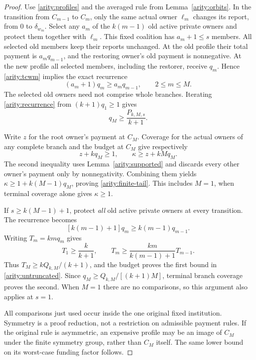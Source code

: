 \begin{proof}
Use \eqref{arity:profiles} and the averaged rule from
Lemma~\ref{arity:orbits}.  In the transition from $C_{m-1}$ to $C_m$, only
the same actual owner $\ell_m$ changes its report, from $0$ to $\delta_{w_m}$.
Select any $a_m$ of the $k(m-1)$ old active private owners and protect them
together with $\ell_m$.  This fixed coalition has $a_m+1\leq s$ members.
All selected old members keep their reports unchanged.  At the old profile
their total payment is $a_mq_{m-1}$, and the restoring owner's old payment
is nonnegative.  At the new profile all selected members, including the
restorer, receive $q_m$.  Hence \eqref{arity:tcwm} implies the exact recurrence
\begin{equation}
  (a_m+1)q_m\geq a_mq_{m-1},\qquad 2\leq m\leq M.
  \label{arity:recurrence}
\end{equation}
The selected old owners need not comprise whole branches.  Iterating
\eqref{arity:recurrence} from $(k+1)q_1\geq1$ gives
\begin{equation}
  q_M\geq\frac{P_{k,M,s}}{k+1}.
  \label{arity:terminal-q}
\end{equation}

Write $z$ for the root owner's payment at $C_M$.  Coverage for the actual
owners of any complete branch and the budget at $C_M$ give respectively
\[
  z+kq_M\geq1,\qquad
  \kappa\geq z+kMq_M.
\]
The second inequality uses Lemma~\ref{arity:supported} and discards every
other owner's payment only by nonnegativity.  Combining them yields
$\kappa\geq1+k(M-1)q_M$, proving \eqref{arity:finite-tail}.  This includes
$M=1$, when terminal coverage alone gives $\kappa\geq1$.

If $s\geq k(M-1)+1$, protect \emph{all} old active private owners at every
transition.  The recurrence becomes
\[
  [k(m-1)+1]q_m\geq k(m-1)q_{m-1}.
\]
Writing $T_m=kmq_m$ gives
\[
  T_1\geq\frac{k}{k+1},\qquad
  T_m\geq\frac{km}{k(m-1)+1}T_{m-1}.
\]
Thus $T_M\geq kQ_{k,M}/(k+1)$, and the budget proves the first bound in
\eqref{arity:untruncated}.  Since
$q_M\geq Q_{k,M}/[(k+1)M]$, terminal branch coverage proves the second.
When $M=1$ there are no comparisons, so this argument also applies at $s=1$.

All comparisons just used occur inside the one original fixed institution.
Symmetry is a proof reduction, not a restriction on admissible payment
rules.  If the original rule is asymmetric, an expensive profile may be an
image of $C_M$ under the finite symmetry group, rather than $C_M$ itself.
The same lower bound on its worst-case funding factor follows.
\end{proof}

